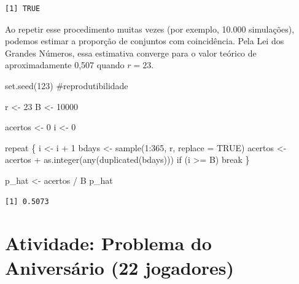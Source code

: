 \documentclass[
  letterpaper,
  DIV=11,
  numbers=noendperiod]{scrreprt}
\newenvironment{Shaded}{\begin{snugshade}}{\end{snugshade}}
\newcommand{\AttributeTok}[1]{\textcolor[rgb]{0.40,0.45,0.13}{#1}}
\newcommand{\CommentTok}[1]{\textcolor[rgb]{0.37,0.37,0.37}{#1}}
\newcommand{\ConstantTok}[1]{\textcolor[rgb]{0.56,0.35,0.01}{#1}}
\newcommand{\ControlFlowTok}[1]{\textcolor[rgb]{0.00,0.23,0.31}{#1}}
\newcommand{\DecValTok}[1]{\textcolor[rgb]{0.68,0.00,0.00}{#1}}
\newcommand{\FunctionTok}[1]{\textcolor[rgb]{0.28,0.35,0.67}{#1}}
\newcommand{\NormalTok}[1]{\textcolor[rgb]{0.00,0.23,0.31}{#1}}
\newcommand{\OtherTok}[1]{\textcolor[rgb]{0.00,0.23,0.31}{#1}}
\newcommand{\SpecialCharTok}[1]{\textcolor[rgb]{0.37,0.37,0.37}{#1}}
\begin{document}
\begin{verbatim}
[1] TRUE
\end{verbatim}

Ao repetir esse procedimento muitas vezes (por exemplo, 10.000
simulações), podemos estimar a proporção de conjuntos com coincidência.
Pela Lei dos Grandes Números, essa estimativa converge para o valor
teórico de aproximadamente 0,507 quando \(r=23\).

\begin{Shaded}
\begin{Highlighting}[]
\FunctionTok{set.seed}\NormalTok{(}\DecValTok{123}\NormalTok{) }\CommentTok{\#reprodutibilidade}

\NormalTok{r }\OtherTok{\textless{}{-}} \DecValTok{23}
\NormalTok{B }\OtherTok{\textless{}{-}} \DecValTok{10000}

\NormalTok{acertos }\OtherTok{\textless{}{-}} \DecValTok{0}
\NormalTok{i }\OtherTok{\textless{}{-}} \DecValTok{0}

\ControlFlowTok{repeat}\NormalTok{ \{}
\NormalTok{  i }\OtherTok{\textless{}{-}}\NormalTok{ i }\SpecialCharTok{+} \DecValTok{1}
\NormalTok{  bdays }\OtherTok{\textless{}{-}} \FunctionTok{sample}\NormalTok{(}\DecValTok{1}\SpecialCharTok{:}\DecValTok{365}\NormalTok{, r, }\AttributeTok{replace =} \ConstantTok{TRUE}\NormalTok{)}
\NormalTok{  acertos }\OtherTok{\textless{}{-}}\NormalTok{ acertos }\SpecialCharTok{+} \FunctionTok{as.integer}\NormalTok{(}\FunctionTok{any}\NormalTok{(}\FunctionTok{duplicated}\NormalTok{(bdays)))}
  \ControlFlowTok{if}\NormalTok{ (i }\SpecialCharTok{\textgreater{}=}\NormalTok{ B) }\ControlFlowTok{break}
\NormalTok{\}}

\NormalTok{p\_hat }\OtherTok{\textless{}{-}}\NormalTok{ acertos }\SpecialCharTok{/}\NormalTok{ B}
\NormalTok{p\_hat}
\end{Highlighting}
\end{Shaded}

\begin{verbatim}
[1] 0.5073
\end{verbatim}

\section*{Atividade: Problema do Aniversário (22
jogadores)}\label{atividade-problema-do-aniversuxe1rio-22-jogadores}

\end{document}
